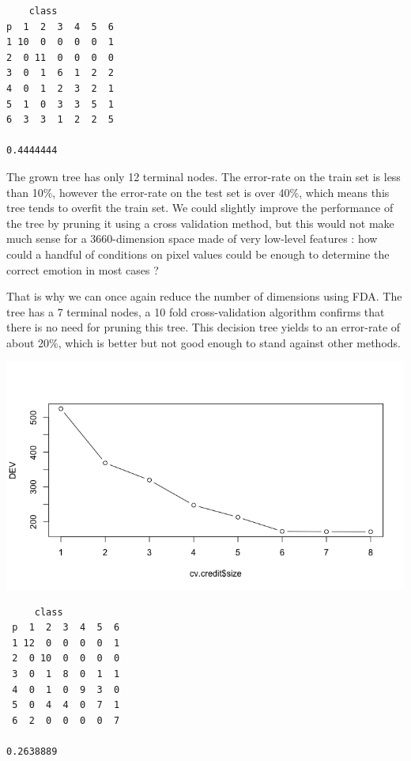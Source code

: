 \documentclass[]{report}
\begin{document}
\begin{verbatim}
    class
p  1  2  3  4  5  6
1 10  0  0  0  0  1
2  0 11  0  0  0  0
3  0  1  6  1  2  2
4  0  1  2  3  2  1
5  1  0  3  3  5  1
6  3  3  1  2  2  5

0.4444444
\end{verbatim}
 
 The grown tree has only 12 terminal nodes. The error-rate on the train set is less than 10\%, however the error-rate on the test set is over 40\%, which means this tree tends to overfit the train set. We could slightly improve the performance of the tree by pruning it using a cross validation method, but this would not make much sense for a 3660-dimension space made of very low-level features : how could a handful of conditions on pixel values could be enough to determine the correct emotion in most cases ?
 
 That is why we can once again reduce the number of dimensions using FDA. The tree has a 7 terminal nodes, a 10 fold cross-validation algorithm confirms that there is no need for pruning this tree. This decision tree yields to an error-rate of about 20\%, which is better but not good enough to stand against other methods.
 
   \begin{center}
 	\includegraphics[width=0.6\linewidth]{Figures/tree_fda.png}
 	\label{fig:tree_fda}
 \end{center}
 
 \begin{verbatim}
     class
 p  1  2  3  4  5  6
 1 12  0  0  0  0  1
 2  0 10  0  0  0  0
 3  0  1  8  0  1  1
 4  0  1  0  9  3  0
 5  0  4  4  0  7  1
 6  2  0  0  0  0  7

0.2638889
 \end{verbatim}
 
\end{document}

